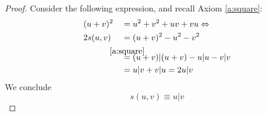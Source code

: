 \begin{proof}
	Consider the following expression, and recall Axiom \ref{a:square}:
	\begin{alignat*}{2}
		&(u+v)^2 &&= u^2 + v^2 + uv + vu \Leftrightarrow \\
		&2s(u,v) &&= (u+v)^2 - u^2 - v^2 \\
		& \ &&\overset{\mathclap{\ref{a:square}}}= (u+v)|(u+v) - u|u - v|v \\
		& \ &&= u|v + v|u = 2u|v 
    \end{alignat*}
	We conclude
	\[s(u,v) \equiv u|v\]
	
\end{proof}
